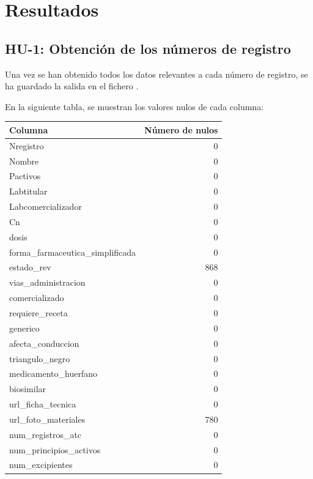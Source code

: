 \documentclass[11pt,a4paper]{article}
\begin{document}
\section{Resultados}

\subsection{HU-1: Obtención de los números de registro}
Una vez se han obtenido todos los datos relevantes a cada número de registro, se ha guardado
la salida en el fichero .

En la siguiente tabla, se muestran los valores nulos de cada columna:

\begin{table}[H]
  \centering
  \begin{tabular}{lr}
    \toprule
    \textbf{Columna} & \textbf{Número de nulos} \\
    \midrule
    Nregistro                          & 0   \\
    Nombre                             & 0   \\
    Pactivos                           & 0   \\
    Labtitular                         & 0   \\
    Labcomercializador                 & 0   \\
    Cn                                 & 0   \\
    dosis                              & 0   \\
    forma\_farmaceutica\_simplificada  & 0   \\
    estado\_rev                        & 868 \\
    vias\_administracion               & 0   \\
    comercializado                     & 0   \\
    requiere\_receta                   & 0   \\
    generico                           & 0   \\
    afecta\_conduccion                 & 0   \\
    triangulo\_negro                   & 0   \\
    medicamento\_huerfano              & 0   \\
    biosimilar                         & 0   \\
    url\_ficha\_tecnica                & 0   \\
    url\_foto\_materiales              & 780 \\
    num\_registros\_atc                & 0   \\
    num\_principios\_activos           & 0   \\
    num\_excipientes                   & 0   \\
    \bottomrule
  \end{tabular}
\end{table}
\end{document}
